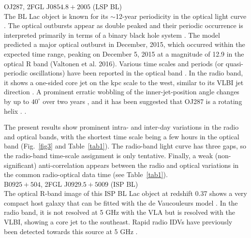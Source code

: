 \documentclass[a4paper,fleqn,usenatbib]{mnras}
\begin{document}
OJ287, 2FGL J\(0854.8+2005\) (LSP BL)\\

The BL Lac object is known for its \(\sim\)12-year
periodicity in the optical light curve \citep{silla88}. The optical
outbursts appear as double peaked and their periodic occurrence is
interpreted primarily in terms of a binary black hole system \citep{valt07}. The model predicted a major optical outburst in  December, 2015, which occurred within the expected time range, peaking on December 5, 2015 at a magnitude of 12.9
in the optical R band (Valtonen et al. 2016). Various time scales and periods (or quasi-periodic oscillations) have been reported in the optical band \citep{sand16,bhat16,zola16}. In the radio band, it shows a one-sided core jet on the kpc scale to the west, similar to its VLBI jet direction \citep{per94}. A prominent erratic wobbling of the inner-jet-position angle changes by up to \(40^{\circ}\) over two years \citep{agu12}, and it has been suggested that OJ287 is a rotating helix \citep{cohen17}.
.

The present results show prominent intra- and inter-day variations in the radio and optical bands, with the shortest time scale being a few hours in the optical band (Fig.~\ref{fig3} and Table~\ref{tab1}). The radio-band light curve has three gaps, so the radio-band time-scale assignment is only tentative. Finally, a weak (non-significant) anti-correlation appears between the radio and optical variations in the common radio-optical data time (see Table~\ref{tab1}).\\

B\(0925+504\), 2FGL J\(0929.5+5009\) (ISP BL)\\

 The optical R-band image of this ISP BL Lac object at redshift 0.37 shows a very compact host galaxy that can be fitted with the de Vaucouleurs model \citep{nils03}. In the radio band, it is not resolved at 5 GHz with the VLA \citep{taylor96} but is resolved with the VLBI, showing a core jet to the southeast. Rapid radio IDVs have previously been detected towards this source at 5 GHz \citep{koay11,liu15}.
\end{document}
